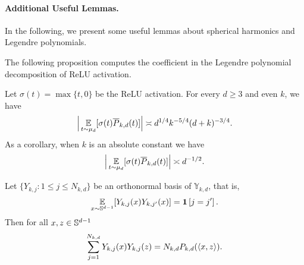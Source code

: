 \paragraph{Additional Useful Lemmas.} In the following, we present some useful lemmas about spherical harmonics and Legendre polynomials.

The following proposition computes the coefficient in the Legendre polynomial decomposition of ReLU activation.
\begin{proposition}\label{prop:relu-coefficient}
    Let $\sigma(t)=\max\{t,0\}$ be the ReLU activation. For every $d\ge 3$ and even $k$, we have
    \begin{align}
        \Big|\operatorname*{\mathbb{E}}_{t\sim \mu_d}[\sigma(t)\overline{P}_{k, d}(t)]\Big|\asymp d^{1/4}k^{-5/4}(d+k)^{-3/4}.
    \end{align}
    As a corollary, when $k$ is an absolute constant we have 
    \begin{align}
        \Big|\operatorname*{\mathbb{E}}_{t\sim \mu_d}[\sigma(t)\overline{P}_{k, d}(t)]\Big|\asymp d^{-1/2}.
    \end{align}
\end{proposition}

\begin{theorem}\label{thm:SH-addition} Let $\{Y_{k,j}:1\le j\le N_{k,d}\}$ be an orthonormal basis of $\mathbb{Y}_{k,d}$, that is,
	\begin{align}
		\operatorname*{\mathbb{E}}_{x\sim \mathbb{S}^{d-1}}[Y_{k,j}(x)Y_{k,j'}(x)]=\mathbf{1}\left[ j=j' \right].
	\end{align}
	Then for all $x,z\in\mathbb{S}^{d-1}$
	\begin{align}
		\sum_{j=1}^{N_{k,d}}Y_{k,j}(x)Y_{k,j}(z)=N_{k,d}P_{k,d}(\left<x, z\right>).
	\end{align}
\end{theorem}

